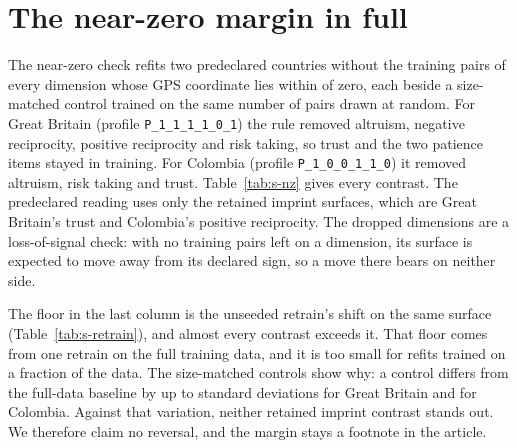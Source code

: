 \documentclass[12pt]{article}
\begin{document}
\section{The near-zero margin in full}\label{sec:s-nz}

The near-zero check refits two predeclared countries without the training pairs of every dimension whose GPS coordinate lies within  of zero, each beside a size-matched control trained on the same number of pairs drawn at random. For Great Britain (profile \texttt{P\_1\_1\_1\_1\_0\_1}) the rule removed altruism, negative reciprocity, positive reciprocity and risk taking, so trust and the two patience items stayed in training. For Colombia (profile \texttt{P\_1\_0\_0\_1\_1\_0}) it removed altruism, risk taking and trust. Table~\ref{tab:s-nz} gives every contrast. The predeclared reading uses only the retained imprint surfaces, which are Great Britain's trust and Colombia's positive reciprocity. The dropped dimensions are a loss-of-signal check: with no training pairs left on a dimension, its surface is expected to move away from its declared sign, so a move there bears on neither side.

The floor in the last column is the unseeded retrain's shift on the same surface (Table~\ref{tab:s-retrain}), and almost every contrast exceeds it. That floor comes from one retrain on the full training data, and it is too small for refits trained on a fraction of the data. The size-matched controls show why: a control differs from the full-data baseline by up to  standard deviations for Great Britain and  for Colombia. Against that variation, neither retained imprint contrast stands out. We therefore claim no reversal, and the margin stays a footnote in the article.
\end{document}
